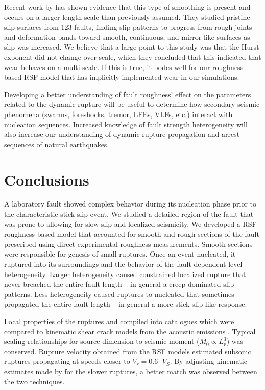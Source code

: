 \documentclass[final,3p, 11pt,authoryear]{elsarticle}
\begin{document}
Recent work by \citet{Dascher-Cousineau2018} has shown evidence that this type of smoothing is present and occurs on a larger length scale than previously assumed. They studied pristine slip surfaces from 123 faults, finding slip patterns to progress from rough joints and deformation bands toward smooth, continuous, and mirror-like surfaces as slip was increased. We believe that a large point to this study was that the Hurst exponent did not change over scale, which they concluded that this indicated that wear behaves on a multi-scale. If this is true, it bodes well for our roughness-based RSF model that has implicitly implemented wear in our simulations. 

Developing a better understanding of fault roughness' effect on the parameters related to the dynamic rupture will be useful to determine how secondary seismic phenomena (swarms, foreshocks, tremor, LFEs, VLFs, etc.) interact with nucleation sequences. Increased knowledge of fault strength heterogeneity will also increase our understanding of dynamic rupture propagation and arrest sequences of natural earthquakes. 

\section{Conclusions}

A laboratory fault showed complex behavior during its nucleation phase prior to the characteristic stick-slip event.  We studied a detailed region of the fault that was prone to allowing for slow slip and localized seismicity.  We developed a RSF roughness-based model that accounted for smooth and rough sections of the fault prescribed using direct experimental roughness measurements. Smooth sections were responsible for genesis of small ruptures.  Once an event nucleated, it ruptured into its surroundings and the behavior of the fault dependent level-heterogeneity.  Larger heterogeneity caused constrained localized rupture that never breached the entire fault length -- in general a creep-dominated slip patterns. Less heterogeneity caused ruptures to nucleated that sometimes propagated the entire fault length -- in general a more stick-slip-like response.  

Local properties of the ruptures and compiled into catalogues which were compared to kinematic shear crack models from the acoustic emissions \citep{Selvadurai2019}.  Typical scaling relationships for source dimension to seismic moment ($M_{0} \propto L^{3}_{r}$) was conserved.  Rupture velocity obtained from the RSF models estimated subsonic ruptures propagating at speeds closer to $V_r = 0.6\cdot V_{S}$.  By adjusting kinematic estimates made by \citet{Selvadurai2019} for the slower ruptures, a better match was observed between the two techniques.
\end{document}
